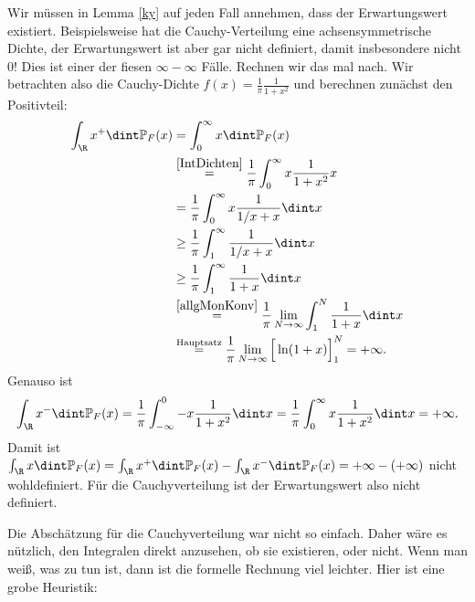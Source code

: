 \begin{warnung}\label{kkk}
 Wir m\"ussen in Lemma \ref{ky} auf jeden Fall annehmen, dass der Erwartungswert existiert. Beispielsweise hat die Cauchy-Verteilung eine achsensymmetrische Dichte, der Erwartungswert ist aber gar nicht definiert, damit insbesondere nicht $0$! Dies ist einer der fiesen $\infty-\infty$ F\"alle. Rechnen wir das mal nach. Wir betrachten also die Cauchy-Dichte $f(x) = \frac{1}{\pi}\frac{1}{1+x^2}$ und berechnen zun\"achst den Positivteil:
 	\begin{align*}
		\int_{\R} x^+ \dint \mathbb{P}_F(x) &= \int_{0}^{\infty} x \dint \mathbb{P}_F(x)\\
		& \overset{\ref{IntDichten}}{=} \frac{1}{\pi} \int_{0}^{\infty} x \frac{1}{1+x^2}x\\
		&= \frac{1}{\pi} \int_{0}^{\infty} x \frac{1}{1/x+x} \dint x\\ 
		&\geq\frac{1}{\pi} \int_{1}^{\infty} \frac{1}{1/x+x} \dint x\\
		& \geq\frac{1}{\pi} \int_{1}^{\infty}  \frac{1}{1+x} \dint x\\ 
		&\overset{\ref{allgMonKonv}}{=} \frac{1}{\pi}\lim\limits_{N \to \infty} \int_{1}^{N}  \frac{1}{1+x} \dint x \\
		&\overset{\text{Hauptsatz}}{=} \frac{1}{\pi}\lim\limits_{N \to \infty} \Big[\ln(1+x)\Big]_1^N=+\infty.
	\end{align*}
	Genauso ist 
	\begin{gather*}
	\int_{\R} x^- \dint \mathbb{P}_F(x) =\frac{1}{\pi} \int_{-\infty}^{0} -x \frac{1}{1+x^2} \dint x =\frac{1}{\pi} \int_0^\infty x \frac{1}{1+x^2}\dint x= +\infty.
	\end{gather*}
	Damit ist $\int_{\R} x \dint \mathbb{P}_F(x) = \int_{\R} x^+ \dint \mathbb{P}_F(x) - \int_{\R} x^- \dint \mathbb{P}_F(x) = +\infty - (+\infty)$ nicht wohldefiniert. F\"ur die Cauchyverteilung ist der Erwartungswert also nicht definiert.
\end{warnung}
Die Absch\"atzung f\"ur die Cauchyverteilung war nicht so einfach. Daher w\"are es n\"utzlich, den Integralen direkt anzusehen, ob sie existieren, oder nicht. Wenn man wei\ss , was zu tun ist, dann ist die formelle Rechnung viel leichter. Hier ist eine grobe Heuristik:
